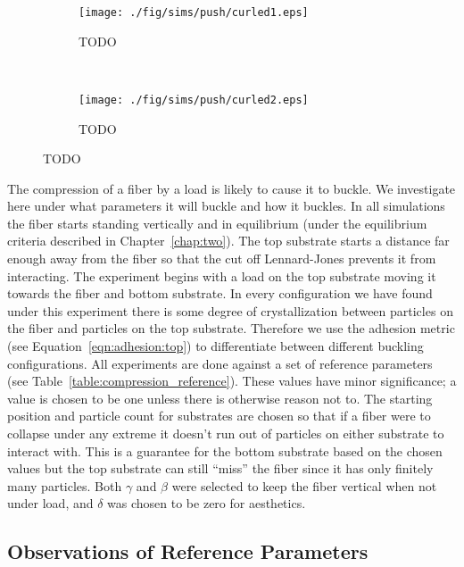 	\begin{figure*}
		\centering
		\begin{subfigure}{.5\textwidth}
			\centering
			\texttt{[image: ./fig/sims/push/curled1.eps]}
			\caption{TODO \label{subfig:push_curled1}}
		\end{subfigure}%
		~
		\begin{subfigure}{.5\textwidth}
			\centering
			\texttt{[image: ./fig/sims/push/curled2.eps]}
			\caption{TODO\label{subfig:push_curled2}}
		\end{subfigure}
		\caption{TODO\label{fig:push_curled}}
	\end{figure*}

The compression of a fiber by a load is likely to cause it to buckle. We investigate here under what parameters it will buckle and how it buckles. In all simulations the fiber starts standing vertically and in equilibrium (under the equilibrium criteria described in Chapter~\ref{chap:two}). The top substrate starts a distance far enough away from the fiber so that the cut off Lennard-Jones prevents it from interacting. The experiment begins with a load on the top substrate moving it towards the fiber and bottom substrate. In every configuration we have found under this experiment there is some degree of crystallization between particles on the fiber and particles on the top substrate. Therefore we use the adhesion metric (see Equation~\ref{eqn:adhesion:top}) to differentiate between different buckling configurations. All experiments are done against a set of reference parameters (see Table~\ref{table:compression_reference}). These values have minor significance; a value is chosen to be one unless there is otherwise reason not to. The starting position and particle count for substrates are chosen so that if a fiber were to collapse under any extreme it doesn't run out of particles on either substrate to interact with. This is a guarantee for the bottom substrate based on the chosen values but the top substrate can still ``miss'' the fiber since it has only finitely many particles. Both $\gamma$ and $\beta$ were selected to keep the fiber vertical when not under load, and $\delta$ was chosen to be zero for aesthetics.

\subsection{Observations of Reference Parameters}

